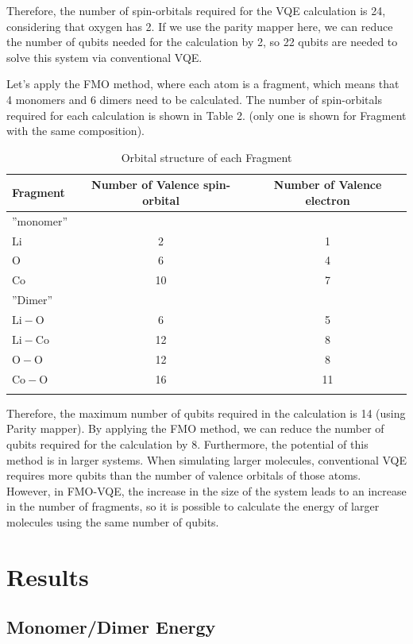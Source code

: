 \documentclass[pdflatex,sn-mathphys-num]{sn-jnl}%
\theoremstyle{thmstyleone}%
\theoremstyle{thmstyletwo}%
\theoremstyle{thmstylethree}%
\begin{document}
Therefore, the number of spin-orbitals required for the VQE calculation is 24, considering that oxygen has 2. If we use the parity mapper here, we can reduce the number of qubits needed for the calculation by 2, so 22 qubits are needed to solve this system via conventional VQE. 

Let's apply the FMO method, where each atom is a fragment, which means that 4 monomers and 6 dimers need to be calculated. The number of spin-orbitals required for each calculation is shown in Table 2. (only one is shown for Fragment with the same composition).

\begin{table}[h]
\caption{Orbital structure of each Fragment}\label{tab2}%
\begin{tabular}{@{}lcc@{}}
\toprule
Fragment & Number of Valence spin-orbital  & Number of Valence electron\\
\midrule
''monomer''   &   &  \\
\(\mathrm{Li}\)   & 2   & 1   \\
\(\mathrm{O}\)   & 6   & 4  \\
\(\mathrm{Co}\)   & 10   & 7   \\
''Dimer''   &   &  \\
\(\mathrm{Li-O}\)   & 6   & 5   \\
\(\mathrm{Li-Co}\)   & 12   & 8  \\
\(\mathrm{O-O}\)   & 12   & 8   \\
\(\mathrm{Co-O}\)   & 16   & 11   \\
\botrule
\end{tabular}
\end{table}

Therefore, the maximum number of qubits required in the calculation is 14 (using Parity mapper). By applying the FMO method, we can reduce the number of qubits required for the calculation by 8. Furthermore, the potential of this method is in larger systems. When simulating larger molecules, conventional VQE requires more qubits than the number of valence orbitals of those atoms. However, in FMO-VQE, the increase in the size of the system leads to an increase in the number of fragments, so it is possible to calculate the energy of larger molecules using the same number of qubits.

\section{Results}\label{sec3}
\subsection{Monomer/Dimer Energy}\label{subsec3.1}
\end{document}
